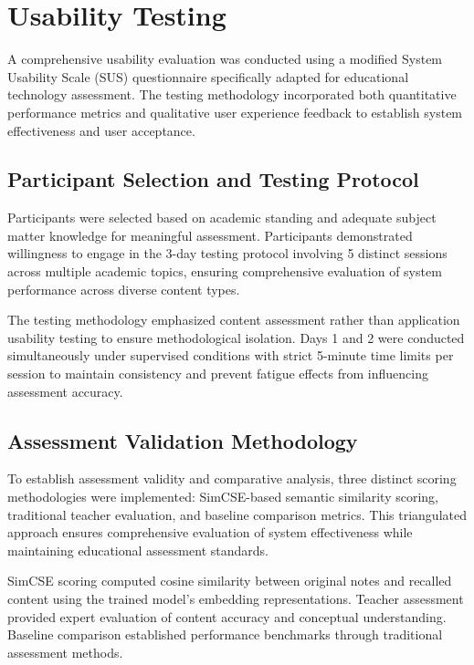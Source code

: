 {{\section{Usability Testing}
\label{sec:usability_testing}

A comprehensive usability evaluation was conducted using a modified System Usability Scale (SUS) questionnaire specifically adapted for educational technology assessment. The testing methodology incorporated both quantitative performance metrics and qualitative user experience feedback to establish system effectiveness and user acceptance.

\subsection{Participant Selection and Testing Protocol}

Participants were selected based on academic standing and adequate subject matter knowledge for meaningful assessment. Participants demonstrated willingness to engage in the 3-day testing protocol involving 5 distinct sessions across multiple academic topics, ensuring comprehensive evaluation of system performance across diverse content types.

The testing methodology emphasized content assessment rather than application usability testing to ensure methodological isolation. Days 1 and 2 were conducted simultaneously under supervised conditions with strict 5-minute time limits per session to maintain consistency and prevent fatigue effects from influencing assessment accuracy.

\subsection{Assessment Validation Methodology}

To establish assessment validity and comparative analysis, three distinct scoring methodologies were implemented: SimCSE-based semantic similarity scoring, traditional teacher evaluation, and baseline comparison metrics. This triangulated approach ensures comprehensive evaluation of system effectiveness while maintaining educational assessment standards.

SimCSE scoring computed cosine similarity between original notes and recalled content using the trained model's embedding representations. Teacher assessment provided expert evaluation of content accuracy and conceptual understanding. Baseline comparison established performance benchmarks through traditional assessment methods.

}}
